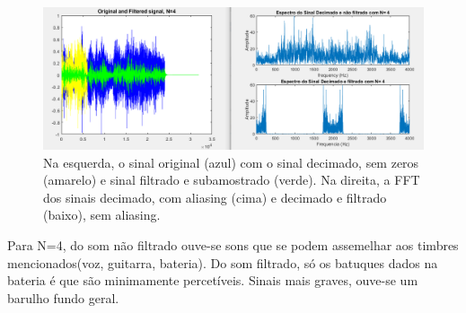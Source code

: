 \documentclass{article}
\begin{document}
\begin{figure}[h!]
\centering
\includegraphics[scale=0.5]{matlab_test_images/cut_images/fil10.PNG}
\caption{Na esquerda, o sinal original (azul) com o sinal decimado, sem zeros (amarelo) e sinal filtrado e subamostrado (verde). Na direita, a FFT dos sinais decimado, com aliasing (cima) e decimado e filtrado (baixo), sem aliasing.}
\label{fig:matlab_test_images/cut_images/fil10}
\end{figure}  

\raggedright
\vspace{5mm} %

Para N=4, do som não filtrado ouve-se sons que se podem assemelhar aos timbres mencionados(voz, guitarra, bateria).
Do som filtrado, só os batuques dados na bateria é que são minimamente percetíveis.
Sinais mais graves, ouve-se um barulho fundo geral.

\newpage
\end{document}
